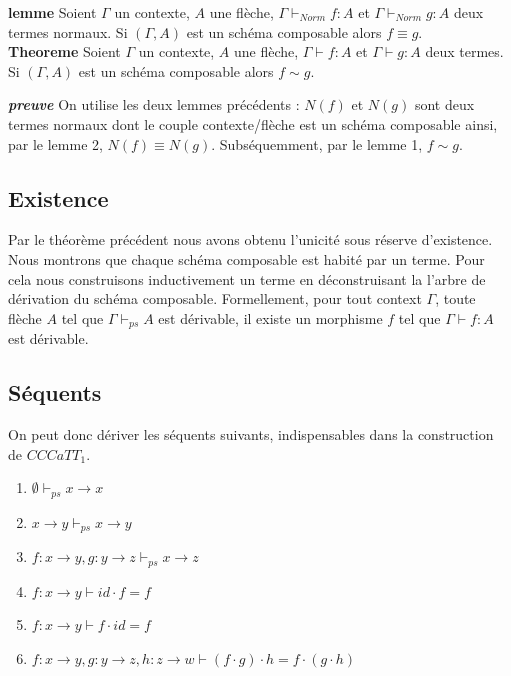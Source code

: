 \documentclass[conference]{IEEEtran}
\begin{document}
\textbf{lemme} Soient $\Gamma$ un contexte, $A$ une flèche, $\Gamma \vdash_{Norm} f : A$ et $\Gamma \vdash_{Norm} g : A$ deux termes normaux. Si $(\Gamma, A)$ est un schéma composable alors $f \equiv g$. \\

\textbf{Theoreme} Soient $\Gamma$ un contexte, $A$ une flèche, $\Gamma \vdash f : A$ et $\Gamma \vdash g : A$ deux termes. Si $(\Gamma, A)$ est un schéma composable alors $f \sim g$.

\textbf{\textit{preuve}} On utilise les deux lemmes précédents : $N(f)$ et $N(g)$ sont deux termes normaux dont le couple contexte/flèche est un schéma composable ainsi, par le lemme 2, $N(f) \equiv N(g)$. Subséquemment, par le lemme 1, $f \sim g$.

\subsection{Existence}
Par le théorème précédent nous avons obtenu l'unicité sous réserve d'existence. Nous montrons que chaque schéma composable est habité par un terme. Pour cela nous construisons inductivement un terme en déconstruisant la l'arbre de dérivation du schéma composable. Formellement, pour tout context $\Gamma$, toute flèche $A$ tel que $\Gamma \vdash_{ps} A$ est dérivable, il existe un morphisme $f$ tel que $\Gamma \vdash f : A$ est dérivable.


\subsection{Séquents}
On peut donc dériver les séquents suivants, indispensables dans la construction de $CCCaTT_1$.

\begin{enumerate}
	\item $\emptyset \vdash_{ps} x \rightarrow x$
	\item $x \rightarrow y \vdash_{ps} x \rightarrow y$
	\item $f : x \rightarrow y, g : y \rightarrow z \vdash_{ps} x \rightarrow z$
	\item $f : x \rightarrow y \vdash id \cdot f = f$
	\item $f : x \rightarrow y \vdash f \cdot id = f$
	\item $f : x \rightarrow y, g : y \rightarrow z, h : z \rightarrow w \vdash (f \cdot g) \cdot h = f \cdot (g \cdot h)$
\end{enumerate}
\end{document}
